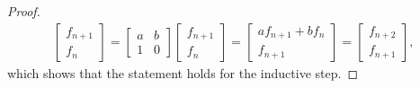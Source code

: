 \documentclass{article}
\begin{document}
\begin{enumerate}
\begin{enumerate}
\begin{proof}
\begin{align*}
\begin{bmatrix}
                    f_{n+1} \\ f_n 
                \end{bmatrix} = \begin{bmatrix}
                    a &b \\ 1 &0 
                \end{bmatrix}\begin{bmatrix}
                    f_{n+1} \\ f_n 
                \end{bmatrix} = \begin{bmatrix}
                    af_{n+1} + bf_n \\ f_{n+1}
                \end{bmatrix} =\begin{bmatrix}
                    f_{n+2} \\ f_{n+1}
                \end{bmatrix},
            \end{align*} which shows that the statement holds for the inductive step. 
        \end{proof} 
    \end{enumerate}
\end{enumerate}
\end{document}
